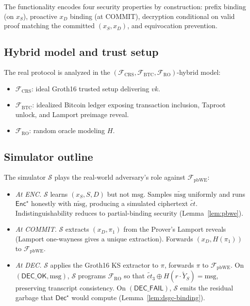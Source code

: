 \documentclass[11pt]{article}
\newcommand{\msg}{\mathrm{msg}}
\newcommand{\Enc}{\mathsf{Enc}}
\newcommand{\Dec}{\mathsf{Dec}}
\begin{document}
The functionality encodes four security properties by construction:
prefix binding (on $x_S$), proactive $x_D$ binding (at COMMIT),
decryption conditional on valid proof matching the committed
$(x_S, x_D)$, and equivocation prevention.

\subsection{Hybrid model and trust setup}

The real protocol is analyzed in the
$(\mathcal{F}_{\mathrm{CRS}}, \mathcal{F}_{\mathrm{BTC}}, \mathcal{F}_{\mathrm{RO}})$-hybrid model:
\begin{itemize}
  \item $\mathcal{F}_{\mathrm{CRS}}$: ideal Groth16 trusted setup delivering $vk$.
  \item $\mathcal{F}_{\mathrm{BTC}}$: idealized Bitcoin ledger exposing transaction inclusion, Taproot unlock, and Lamport preimage reveal.
  \item $\mathcal{F}_{\mathrm{RO}}$: random oracle modeling $H$.
\end{itemize}

\subsection{Simulator outline}

The simulator $\mathcal{S}$ plays the real-world adversary's role
against $\mathcal{F}_{\mathrm{pbWE}}$:

\begin{itemize}
  \item \emph{At ENC.} $\mathcal{S}$ learns $(x_S, S, D)$ but not
    $\msg$. Samples $\widetilde{\msg}$ uniformly and runs
    $\Enc^\star$ honestly with $\widetilde{\msg}$, producing a
    simulated ciphertext $\widetilde{ct}$. Indistinguishability
    reduces to partial-binding security
    (Lemma~\ref{lem:pbwe}).
  \item \emph{At COMMIT.} $\mathcal{S}$ extracts
    $(x_D, \pi_1)$ from the Prover's Lamport reveals (Lamport
    one-wayness gives a unique extraction). Forwards
    $(x_D, H(\pi_1))$ to $\mathcal{F}_{\mathrm{pbWE}}$.
  \item \emph{At DEC.} $\mathcal{S}$ applies the Groth16 KS extractor
    to $\pi$, forwards $\pi$ to $\mathcal{F}_{\mathrm{pbWE}}$. On
    $(\mathsf{DEC\_OK}, \msg)$, $\mathcal{S}$ programs
    $\mathcal{F}_{\mathrm{RO}}$ so that
    $\widetilde{ct}_3 \oplus H(r \cdot \widetilde{Y}_S) = \msg$,
    preserving transcript consistency. On
    $(\mathsf{DEC\_FAIL})$, $\mathcal{S}$ emits the residual garbage
    that $\Dec^\star$ would compute (Lemma~\ref{lem:dsgc-binding}).
\end{itemize}
\end{document}
